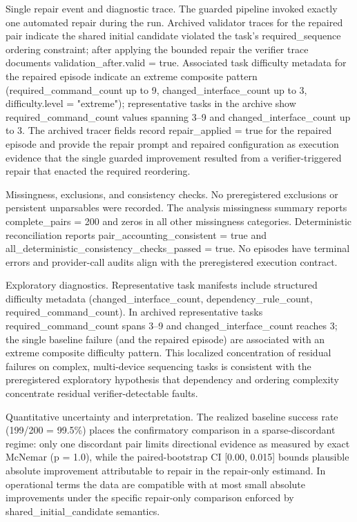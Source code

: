 \documentclass[conference]{IEEEtran}
\begin{document}
Single repair event and diagnostic trace. The guarded pipeline invoked exactly one automated repair during the run. Archived validator traces for the repaired pair indicate the shared initial candidate violated the task's required\_sequence ordering constraint; after applying the bounded repair the verifier trace documents validation\_after.valid = true. Associated task difficulty metadata for the repaired episode indicate an extreme composite pattern (required\_command\_count up to 9, changed\_interface\_count up to 3, difficulty.level = "extreme"); representative tasks in the archive show required\_command\_count values spanning 3--9 and changed\_interface\_count up to 3. The archived tracer fields record repair\_applied = true for the repaired episode and provide the repair prompt and repaired configuration as execution evidence that the single guarded improvement resulted from a verifier-triggered repair that enacted the required reordering.

Missingness, exclusions, and consistency checks. No preregistered exclusions or persistent unparsables were recorded. The analysis missingness summary reports complete\_pairs = 200 and zeros in all other missingness categories. Deterministic reconciliation reports pair\_accounting\_consistent = true and all\_deterministic\_consistency\_checks\_passed = true. No episodes have terminal errors and provider-call audits align with the preregistered execution contract.

Exploratory diagnostics. Representative task manifests include structured difficulty metadata (changed\_interface\_count, dependency\_rule\_count, required\_command\_count). In archived representative tasks required\_command\_count spans 3--9 and changed\_interface\_count reaches 3; the single baseline failure (and the repaired episode) are associated with an extreme composite difficulty pattern. This localized concentration of residual failures on complex, multi-device sequencing tasks is consistent with the preregistered exploratory hypothesis that dependency and ordering complexity concentrate residual verifier-detectable faults.

Quantitative uncertainty and interpretation. The realized baseline success rate (199/200 = 99.5\%) places the confirmatory comparison in a sparse-discordant regime: only one discordant pair limits directional evidence as measured by exact McNemar (p = 1.0), while the paired-bootstrap CI [0.00, 0.015] bounds plausible absolute improvement attributable to repair in the repair-only estimand. In operational terms the data are compatible with at most small absolute improvements under the specific repair-only comparison enforced by shared\_initial\_candidate semantics.
\end{document}
